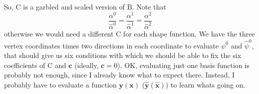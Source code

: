 \documentclass{scrartcl}
\begin{document}
So, $\mathrm C$ is a garbled and scaled version of $\mathrm B$.  Note that
\begin{equation}
  \frac{\alpha^0}{\hat\alpha^0}
  =\frac{\alpha^1}{\hat\alpha^1}
  =\frac{\alpha^2}{\hat\alpha^2}
\end{equation}
otherwise we would need a different $\mathrm C$ for each shape function.
We
have the three vertex coordinates times two directions in each coordinate to
evaluate $\psi^0$ and $\hat\psi^0$, that should give us six conditions with
which we should be able to fix the six coefficients of $\mathrm C$ and
$\mathbf c$ (ideally, $\mathbf c=0$).  OK, evaluating just one basis function
is probably not enough, since I already know what to expect there.  Instead, I
probably have to evaluate a function $\mathbf y(\mathbf x)$ ($\mathbf{\hat
  y}(\mathbf{\hat x})$) to learn whats going on.
\end{document}
